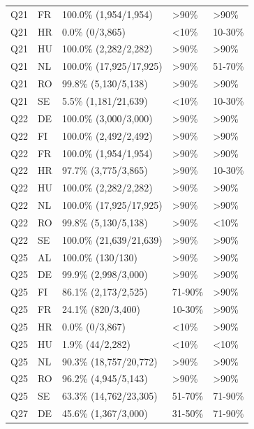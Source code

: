 {\begin{longtable}[]{@{}
  L{0.1274}
  L{0.1177}
  L{0.3333}
  L{0.1470}
  L{0.2745}@{}}
Q21 & FR & 100.0\% (1,954/1,954) & \textgreater90\% & \textgreater90\% \\
Q21 & HR & 0.0\% (0/3,865) & \textless10\% & 10-30\% \\
Q21 & HU & 100.0\% (2,282/2,282) & \textgreater90\% & \textgreater90\% \\
Q21 & NL & 100.0\% (17,925/17,925) & \textgreater90\% & 51-70\% \\
Q21 & RO & 99.8\% (5,130/5,138) & \textgreater90\% & \textgreater90\% \\
Q21 & SE & 5.5\% (1,181/21,639) & \textless10\% & 10-30\% \\
Q22 & DE & 100.0\% (3,000/3,000) & \textgreater90\% & \textgreater90\% \\
Q22 & FI & 100.0\% (2,492/2,492) & \textgreater90\% & \textgreater90\% \\
Q22 & FR & 100.0\% (1,954/1,954) & \textgreater90\% & \textgreater90\% \\
Q22 & HR & 97.7\% (3,775/3,865) & \textgreater90\% & 10-30\% \\
Q22 & HU & 100.0\% (2,282/2,282) & \textgreater90\% & \textgreater90\% \\
Q22 & NL & 100.0\% (17,925/17,925) & \textgreater90\% & \textgreater90\% \\
Q22 & RO & 99.8\% (5,130/5,138) & \textgreater90\% & \textless10\% \\
Q22 & SE & 100.0\% (21,639/21,639) & \textgreater90\% & \textgreater90\% \\
Q25 & AL & 100.0\% (130/130) & \textgreater90\% & \textgreater90\% \\
Q25 & DE & 99.9\% (2,998/3,000) & \textgreater90\% & \textgreater90\% \\
Q25 & FI & 86.1\% (2,173/2,525) & 71-90\% & \textgreater90\% \\
Q25 & FR & 24.1\% (820/3,400) & 10-30\% & \textgreater90\% \\
Q25 & HR & 0.0\% (0/3,867) & \textless10\% & \textgreater90\% \\
Q25 & HU & 1.9\% (44/2,282) & \textless10\% & \textless10\% \\
Q25 & NL & 90.3\% (18,757/20,772) & \textgreater90\% & \textgreater90\% \\
Q25 & RO & 96.2\% (4,945/5,143) & \textgreater90\% & \textgreater90\% \\
Q25 & SE & 63.3\% (14,762/23,305) & 51-70\% & 71-90\% \\
Q27 & DE & 45.6\% (1,367/3,000) & 31-50\% & 71-90\% \\

\end{longtable}}
